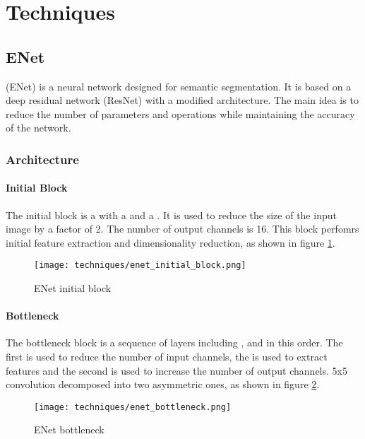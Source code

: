\section{Techniques}

  \subsection{ENet\cite{paszke2016enet}}

     (ENet) is a  neural network designed
    for  semantic segmentation. It is based on a deep residual network (ResNet)
    with a modified architecture. The main idea is to reduce the number of parameters and
    operations while maintaining the accuracy of the network\cite{paszke2016enet}.
    
    \subsubsection{Architecture}

      \paragraph{Initial Block}

        The initial block is a  with a 
        and a . It is used to reduce the size of the input image
        by a factor of 2. The number of output channels is 16\cite{paszke2016enet}.
        This block perfomrs initial feature extraction and dimensionality reduction,
        as shown in figure \ref{fig:enet_initial_block}.
        \begin{figure}[htbp]
          \centering
          \texttt{[image: techniques/enet\_initial\_block.png]}
          \caption{ENet initial block\cite{paszke2016enet}}
          \label{fig:enet_initial_block}
        \end{figure}

      \paragraph{Bottleneck}

        The bottleneck block is a sequence of layers including ,
         and  in this order. The first
         is used to reduce the number of input channels,
        the  is used to extract features and the second
         is used to increase the number of output channels.
        5x5 convolution decomposed into two asymmetric ones\cite{paszke2016enet},
        as shown in figure \ref{fig:enet_bottleneck}.
        \begin{figure}[htbp]
          \centering
          \texttt{[image: techniques/enet\_bottleneck.png]}
          \caption{ENet bottleneck\cite{paszke2016enet}}
          \label{fig:enet_bottleneck}
        \end{figure}

